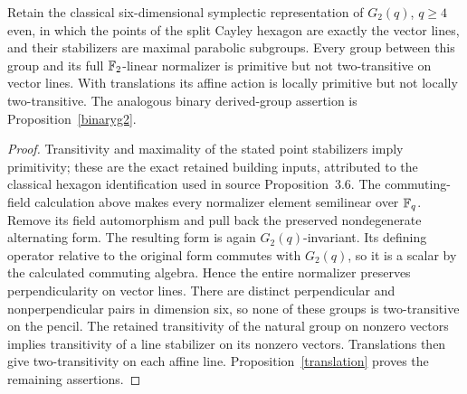 \begin{proposition}\label{naturalg2}
Retain the classical six-dimensional symplectic representation of
$G_2(q)$, $q\geq4$ even, in which the points of the split Cayley hexagon
are exactly the vector lines, and their stabilizers are maximal
parabolic subgroups. Every group between this group and its full
$\mathbb F_2$-linear normalizer is primitive but not two-transitive on vector
lines. With translations its affine action is locally primitive but not
locally two-transitive. The analogous binary derived-group assertion
is Proposition~\ref{binaryg2}.
\end{proposition}
\begin{proof}
Transitivity and maximality of the stated point stabilizers imply
primitivity; these are the exact retained building inputs, attributed
to the classical hexagon identification used in source Proposition~3.6.
The commuting-field calculation above makes every normalizer element
semilinear over $\mathbb F_q$. Remove its field automorphism and pull back the
preserved nondegenerate alternating form. The resulting form is again
$G_2(q)$-invariant. Its defining operator relative to the original form
commutes with $G_2(q)$, so it is a scalar by the calculated commuting
algebra. Hence the entire normalizer preserves perpendicularity on
vector lines. There are distinct perpendicular and nonperpendicular
pairs in dimension six, so none of these groups is two-transitive on
the pencil. The retained transitivity of the natural group on nonzero
vectors implies transitivity of a line stabilizer on its nonzero
vectors. Translations then give two-transitivity on each affine line.
Proposition~\ref{translation} proves the remaining assertions.
\end{proof}

